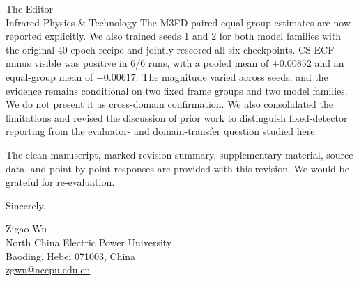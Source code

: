 \documentclass[a4paper,10pt]{letter}
\begin{document}
\begin{letter}{The Editor\\Infrared Physics \& Technology}
The M3FD paired equal-group estimates are now reported explicitly. We also
trained seeds 1 and 2 for both model families with the original 40-epoch recipe
and jointly rescored all six checkpoints. CS-ECF minus visible was positive in
6/6 runs, with a pooled mean of \(+0.00852\) and an equal-group mean of
\(+0.00617\). The magnitude varied across seeds, and the evidence remains
conditional on two fixed frame groups and two model families. We do not present
it as cross-domain confirmation. We also consolidated the limitations and
revised the discussion of prior work to distinguish fixed-detector reporting
from the evaluator- and domain-transfer question studied here.

The clean manuscript, marked revision summary, supplementary material, source
data, and point-by-point responses are provided with this revision. We would
be grateful for re-evaluation.

\closing{Sincerely,}
Zigao Wu\\
North China Electric Power University\\
Baoding, Hebei 071003, China\\
\href{mailto:zgwu@ncepu.edu.cn}{zgwu@ncepu.edu.cn}
\end{letter}
\end{document}
